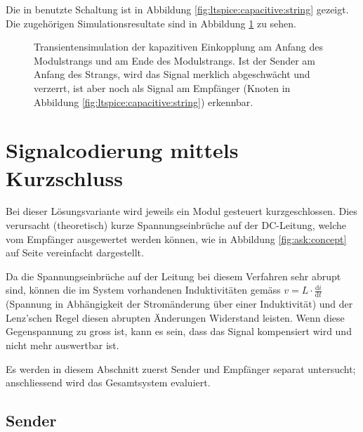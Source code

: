 Die    in        benutzte    Schaltung    ist    in    Abbildung
\ref{fig:ltspice:capacitive:string}      gezeigt.       Die      zugeh\"origen
Simulationsresultate   sind    in   Abbildung   \ref{fig:simu:capacitive:tran}
zu sehen.%

\begin{figure}[h!tb]
    
    \caption[Simulationsergebnisse kapazitive Einkopplung, Modulstrang]{%
        Transientensimulation  der  kapazitiven   Einkopplung  am  Anfang  des
        Modulstrangs und  am Ende des  Modulstrangs. Ist der Sender  am Anfang
        des Strangs, wird das Signal merklich abgeschw\"acht und verzerrt, ist
        aber  noch  als  Signal  am  Empf\"anger  (Knoten    in
        Abbildung \ref{fig:ltspice:capacitive:string}) erkennbar.%
    }
    \label{fig:simu:capacitive:tran}
\end{figure}


\clearpage
\section{Signalcodierung mittels Kurzschluss}
\label{sec:simu:short}

Bei   dieser    L\"osungsvariante   wird    jeweils   ein    Modul   gesteuert
kurzgeschlossen. Dies  verursacht   (theoretisch)  kurze  Spannungseinbr\"uche
auf  der  DC-Leitung,  welche  vom Empf\"anger  ausgewertet  werden  k\"onnen,
wie  in Abbildung  \ref{fig:ask:concept}  auf Seite  \pageref{fig:ask:concept}
vereinfacht dargestellt.

Da die Spannungseinbr\"uche  auf der Leitung bei diesem  Verfahren sehr abrupt
sind,  k\"onnen  die im  System  vorhandenen  Induktivit\"aten gem\"ass  $v  =
L  \cdot  \frac{\mathrm{d}i}{\mathrm{d}t}$  (Spannung  in  Abh\"angigkeit  der
Strom\"anderung \"uber  einer Induktivit\"at) und der  Lenz'schen Regel diesen
abrupten \"Anderungen  Widerstand leisten. Wenn  diese Gegenspannung  zu gross
ist, kann es sein, dass das  Signal kompensiert wird und nicht mehr auswertbar
ist.

Es  werden  in   diesem  Abschnitt  zuerst  Sender   und  Empf\"anger  separat
untersucht; anschliessend wird das Gesamtsystem evaluiert.


\subsection{Sender}
\label{subsec:simu:ask:sensor}

